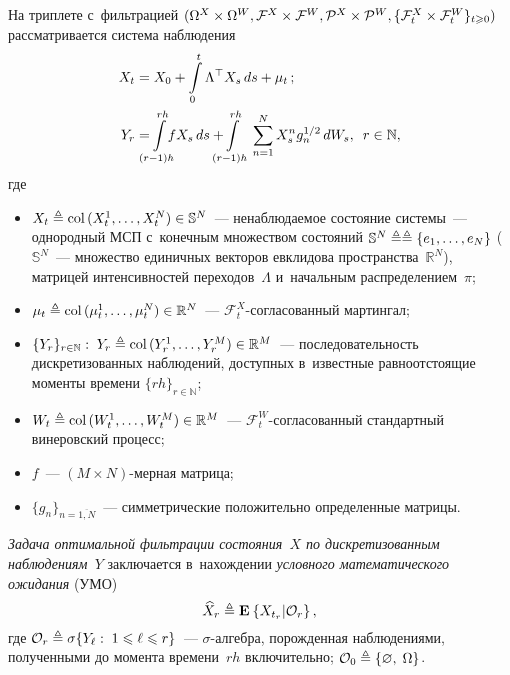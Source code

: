 \begin{multicols}{2}
 На триплете с~фильтрацией 
 $(\Omega^X \times \Omega^W,\mathcal{F}^X \hm\times \mathcal{F}^W,
 \mathcal{P}^X \times \mathcal{P}^W, 
 \{\mathcal{F}^X_t \times \mathcal{F}^W_t\}_{t \geqslant 0})$
  рассматривается сис\-те\-ма наблюдения
\begin{align*}
X_t &= \displaystyle X_0 + \int\limits_0^t \Lambda^{\top}X_{s}\,ds + \mu_t\,; \\
 Y_r &= \displaystyle\!\!\!\!\!\int\limits_{(r-1)h}^{rh}\!\!\!\!\!
 fX_s \,ds+\!\!\!\!\!\int\limits_{(r-1)h}^{rh}
  \sum\limits_{n=1}^NX_s^ng_n^{1/2} \,dW_s,\enskip 
 r \in \mathbb{N},
 \end{align*}
 где
  \begin{itemize}
  \item
  $X_t  \triangleq \mathop{\mathrm{col}\,}(X_t^1,\ldots,X_t^N) \in \mathbb{S}^N$~--- 
  не\-наблю\-да\-емое состояние сис\-те\-мы~--- 
  однородный МСП с~конечным множеством со\-сто\-яний 
  $\mathbb{S}^N \ebd\linebreak \ebd \{e_1,\ldots,e_N\}$ ($\mathbb{S}^N$~--- 
  множество единичных век\-то\-ров евклидова пространства~$\mathbb{R}^N$), 
  матрицей интенсивностей переходов~$\Lambda$ и~начальным распределением~$\pi$;
  \item
  $\mu_t \triangleq \mathop{\mathrm{col}\,}(
  \mu_t^1,\ldots,\mu_t^N)\in \mathbb{R}^N$~--- 
  $\mathcal{F}_t^X$-со\-гла\-со\-ван\-ный мартингал;
  \item
  $\{Y_r\}_{r \in \mathbb{N}}:\;  Y_r \ebd \col(Y_r^1,\ldots,Y_r^M) 
  \hm\in \mathbb{R}^M$~--- последовательность дискретизованных 
  наблюдений, доступных в~известные равноотстоящие моменты 
  времени $\{rh\}_{r \in \mathbb{N}}$;
  \item
$W_t \triangleq \mathop{\mathrm{col}\,}(W_t^1,\ldots,W_t^M) \in \mathbb{R}^M$~--- 
$\mathcal{F}_t^W$-со\-гла\-со\-ван\-ный стандартный винеровский процесс;  
\item $f$~--- $(M \times N)$-мер\-ная матрица;
\item $\{g_n\}_{n=\overline{1,N}}$~--- 
симметрические положительно определенные матрицы.
  \end{itemize}

   \textit{Задача оптимальной фильтрации состояния~$X$ 
   по дискретизованным наблюдениям~$Y$} заключается в~нахождении 
   \textit{условного математического ожидания} (УМО)
  \begin{equation*}
  \widehat{X}_r \triangleq \mathbf{E}_{  }\left\{ \mathop{X_{t_r}|\mathcal{O}_{r} } \right\},
  \end{equation*}
  где $\mathcal{O}_r \triangleq \sigma\{ Y_{\ell}: \; 1 \leqslant
   \ell \leqslant r\}$~--- $\sigma$-ал\-геб\-ра, по\-рож\-ден\-ная 
   наблюдениями, полученными до момента времени~$rh$ включительно; 
   $\mathcal{O}_0 \triangleq \{\varnothing,\; \Omega\}$.


\end{multicols}
